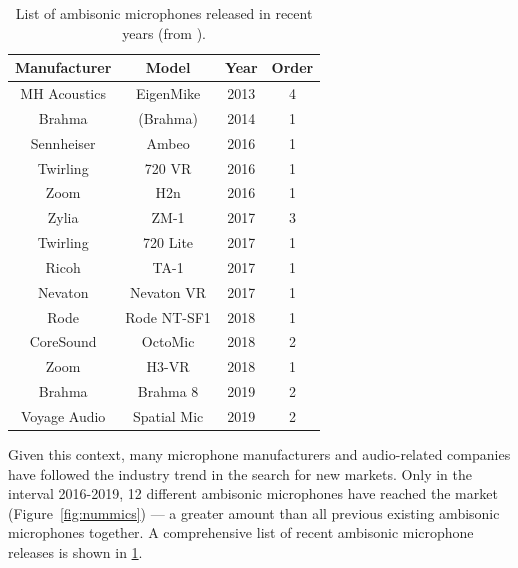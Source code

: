 \begin{table}[t!]
\centering
\caption{List of ambisonic microphones released in recent years (from \cite{List_of_Ambisonic_hardware}).}
\begin{tabular}{cccc}
  \toprule
Manufacturer & Model   & Year & Order \\
\midrule
MH Acoustics & EigenMike   & 2013                     & 4                         \\
Brahma       & (Brahma)                                                   & 2014                     & 1                         \\
Sennheiser   & Ambeo                                                      & 2016                     & 1                         \\
Twirling     & 720 VR    & 2016                     & 1                         \\
Zoom         & H2n                                                        & 2016                     & 1                         \\
Zylia        & ZM-1                                                       & 2017                     & 3                         \\
Twirling     & 720 Lite    & 2017                     & 1                         \\
Ricoh        &  TA-1        & 2017                     & 1                         \\
Nevaton      & Nevaton VR                                                 & 2017                     & 1                         \\
Rode         &  Rode NT-SF1 & 2018                     & 1                         \\
CoreSound    &  OctoMic     & 2018                     & 2                         \\
Zoom         & H3-VR                                                      & 2018                     & 1                         \\
Brahma       & Brahma 8                                                   & 2019                     & 2                         \\
Voyage Audio & Spatial Mic  & 2019    & 2  \\
\bottomrule
\end{tabular}
\label{tab:nummics}
\end{table}


Given this context, many microphone manufacturers and audio-related companies have followed the industry trend in the search for new markets. Only in the interval 2016-2019, 12 different ambisonic microphones have reached the market (Figure~\ref{fig:nummics}) --- a greater amount than all previous existing ambisonic microphones together. A comprehensive list of recent ambisonic microphone releases is shown in \ref{tab:nummics}.


